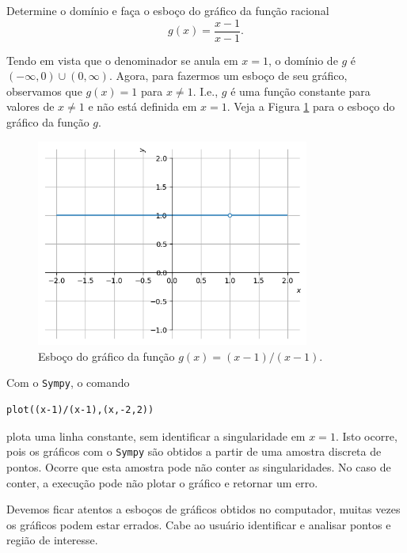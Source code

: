 \begin{exer}
  Determine o domínio e faça o esboço do gráfico da função racional
  \begin{equation}
    g(x) = \frac{x-1}{x-1}.
  \end{equation}
\end{exer}
\begin{resol}
  Tendo em vista que o denominador se anula em $x=1$, o domínio de $g$ é $(-\infty, 0)\cup (0, \infty)$. Agora, para fazermos um esboço de seu gráfico, observamos que $g(x)=1$ para $x\neq 1$. I.e., $g$ é uma função constante para valores de $x\neq 1$ e não está definida em $x=1$. Veja a Figura \ref{fig:exeresol_funracio_graf} para o esboço do gráfico da função $g$.

  \begin{figure}[H]
    \centering
    \includegraphics[width=0.8\textwidth]{./cap_funcao/dados/fig_exeresol_funracio_graf/fig_exeresol_funracio_graf}
    \caption{Esboço do gráfico da função $g(x) = (x-1)/(x-1)$.}
    \label{fig:exeresol_funracio_graf}
  \end{figure}

  \ifispython
  Com o \verb+Sympy+, o comando
\begin{verbatim}
plot((x-1)/(x-1),(x,-2,2))
\end{verbatim}
  plota uma linha constante, sem identificar a singularidade em $x=1$. Isto ocorre, pois os gráficos com o \verb+Sympy+ são obtidos a partir de uma amostra discreta de pontos. Ocorre que esta amostra pode não conter as singularidades. No caso de conter, a execução pode não plotar o gráfico e retornar um erro.

  Devemos ficar atentos a esboços de gráficos obtidos no computador, muitas vezes os gráficos podem estar errados. Cabe ao usuário identificar e analisar pontos e região de interesse.
  \fi
\end{resol}


